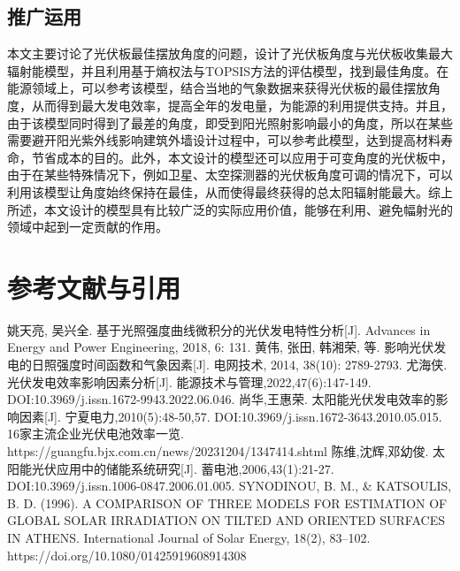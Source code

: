 \documentclass[withoutpreface,bwprint]{cumcmthesis} %
\begin{document}
\subsection{推广运用}

本文主要讨论了光伏板最佳摆放角度的问题，设计了光伏板角度与光伏板收集最大辐射能模型，并且利用基于熵权法与TOPSIS方法的评估模型，找到最佳角度。在能源领域上，可以参考该模型，结合当地的气象数据来获得光伏板的最佳摆放角度，从而得到最大发电效率，提高全年的发电量，为能源的利用提供支持。并且，由于该模型同时得到了最差的角度，即受到阳光照射影响最小的角度，所以在某些需要避开阳光紫外线影响建筑外墙设计过程中，可以参考此模型，达到提高材料寿命，节省成本的目的。此外，本文设计的模型还可以应用于可变角度的光伏板中，由于在某些特殊情况下，例如卫星、太空探测器的光伏板角度可调的情况下，可以利用该模型让角度始终保持在最佳，从而使得最终获得的总太阳辐射能最大。综上所述，本文设计的模型具有比较广泛的实际应用价值，能够在利用、避免幅射光的领域中起到一定贡献的作用。


\section{参考文献与引用}

\begin{thebibliography}{9}%
    姚天亮, 吴兴全. 基于光照强度曲线微积分的光伏发电特性分析[J]. Advances in Energy and Power Engineering, 2018, 6: 131.
    黄伟, 张田, 韩湘荣, 等. 影响光伏发电的日照强度时间函数和气象因素[J]. 电网技术, 2014, 38(10): 2789-2793.
    尤海侠. 光伏发电效率影响因素分析[J]. 能源技术与管理,2022,47(6):147-149. DOI:10.3969/j.issn.1672-9943.2022.06.046.
    尚华,王惠荣. 太阳能光伏发电效率的影响因素[J]. 宁夏电力,2010(5):48-50,57. DOI:10.3969/j.issn.1672-3643.2010.05.015.
    16家主流企业光伏电池效率一览. https://guangfu.bjx.com.cn/news/20231204/1347414.shtml
    陈维,沈辉,邓幼俊. 太阳能光伏应用中的储能系统研究[J]. 蓄电池,2006,43(1):21-27. DOI:10.3969/j.issn.1006-0847.2006.01.005.
    SYNODINOU, B. M., \& KATSOULIS, B. D. (1996). A COMPARISON OF THREE MODELS FOR ESTIMATION OF GLOBAL SOLAR IRRADIATION ON TILTED AND ORIENTED SURFACES IN ATHENS. International Journal of Solar Energy, 18(2), 83–102. https://doi.org/10.1080/01425919608914308
\end{thebibliography}

\newpage
\end{document}

